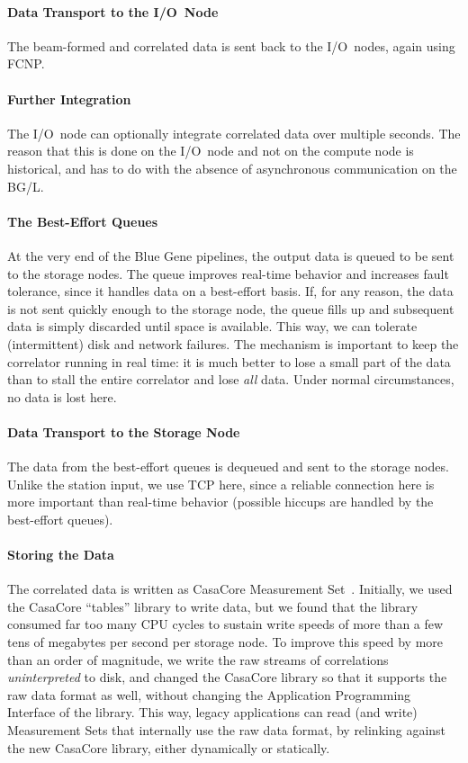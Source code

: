 \paragraph{Data Transport to the I/O~Node }
The beam-formed and correlated data is sent back to the I/O~nodes, again
using FCNP.

\paragraph{Further Integration }
The I/O~node can optionally integrate correlated data over multiple seconds.
The reason that this is done on the I/O~node and not on the compute node is
historical, and has to do with the absence of asynchronous communication
on the BG/L.


\paragraph{The Best-Effort Queues }
At the very end of the Blue Gene pipelines, the output data is queued to
be sent to the storage nodes.
The queue improves real-time behavior and increases fault tolerance, since
it handles data on a best-effort basis.
If, for any reason, the data is not sent quickly enough to the storage node,
the queue fills up and subsequent data is simply discarded until space is
available.
This way, we can tolerate (intermittent) disk and network failures.
The mechanism is important to keep the correlator running in real
time: it is much better to lose a small part of the data than to stall the
entire correlator and lose \emph{all\/} data.
Under normal circumstances, no data is lost here.


\paragraph{Data Transport to the Storage Node }
The data from the best-effort queues is dequeued and sent to the storage nodes.
Unlike the station input, we use TCP here, since a reliable connection here
is more important than real-time behavior (possible hiccups are handled by
the best-effort queues).


\paragraph{Storing the Data }
The correlated data is written as CasaCore Measurement Set~\cite{Kemball:00}.
Initially, we used the CasaCore ``tables'' library to write data, but we
found that the library consumed far too many CPU cycles to sustain write
speeds of more than a few tens of megabytes per second per storage node.
To improve this speed by more than an order of magnitude, we write the
raw streams of correlations \emph{uninterpreted\/} to disk, and changed
the CasaCore library so that it supports the raw data format as well,
without changing the Application Programming Interface of the library.
This way, legacy applications can read (and write) Measurement Sets that
internally use the raw data format, by relinking against the new CasaCore
library, either dynamically or statically.

